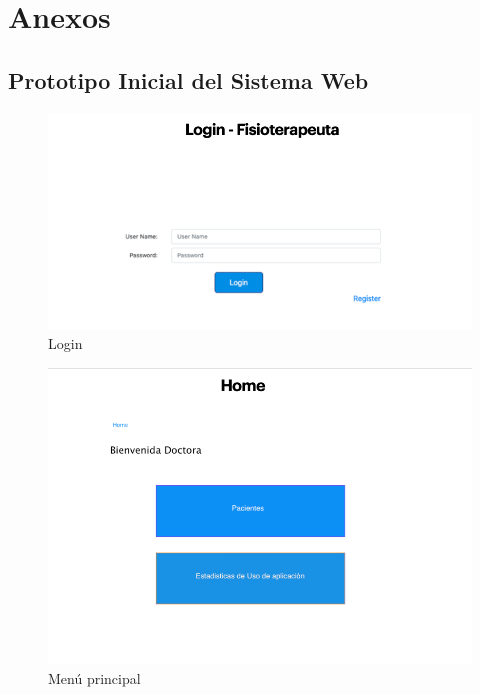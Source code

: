 \documentclass[12pt]{article}
\begin{document}
\newpage





\nocite{1}
\nocite{2}
\nocite{3}
\nocite{4}
\nocite{5}


\newpage

\section{Anexos}
\subsection{Prototipo Inicial del Sistema Web} 


\begin{figure}[ht]
\centering
\includegraphics[scale=0.4]{imag/P1.png}
\caption{Login }
\label{54}
\end{figure}
\FloatBarrier

\begin{figure}[ht]
\centering
\includegraphics[scale=0.4]{imag/P3.png}
\caption{Menú principal }
\label{55}
\end{figure}
\FloatBarrier
\end{document}
